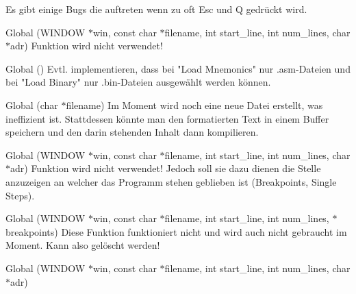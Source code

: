 \begin{DoxyRefList}
Es gibt einige Bugs die auftreten wenn zu oft \textquotesingle{}Esc\textquotesingle{} und \textquotesingle{}Q\textquotesingle{} gedrückt wird. 
\item[Global \doxylink{debugger_8c_a19b22144694590f898d23442237aecac}{del\+Marked\+Line} (WINDOW \texorpdfstring{$\ast$}{*}win, const char \texorpdfstring{$\ast$}{*}filename, int start\+\_\+line, int num\+\_\+lines, char \texorpdfstring{$\ast$}{*}adr)]\label{todo__todo000014}%
%
Funktion wird nicht verwendet! 
\item[Global \doxylink{filechooser_8c_a48924acb10cfd3bf3cb170d134f05f8f}{filechooser} ()]\label{todo__todo000018}%
%
Evtl. implementieren, dass bei "{}\+Load Mnemonics"{} nur .asm-\/\+Dateien und bei "{}\+Load Binary"{} nur .bin-\/\+Dateien ausgewählt werden können.  
\item[Global \doxylink{Compiler_8h_a374ccb28373614a55ce393e47b81acab}{format\+File} (char \texorpdfstring{$\ast$}{*}filename)]\label{todo__todo000004}%
%
Im Moment wird noch eine neue Datei erstellt, was ineffizient ist. Stattdessen könnte man den formatierten Text in einem Buffer speichern und den darin stehenden Inhalt dann kompilieren. 
\item[Global \doxylink{debugger_8c_aabd40a78225de224f26b54c84693903d}{highlight\+Line} (WINDOW \texorpdfstring{$\ast$}{*}win, const char \texorpdfstring{$\ast$}{*}filename, int start\+\_\+line, int num\+\_\+lines, char \texorpdfstring{$\ast$}{*}adr)]\label{todo__todo000015}%
%
Funktion wird nicht verwendet! Jedoch soll sie dazu dienen die Stelle anzuzeigen an welcher das Programm stehen geblieben ist (Breakpoints, Single Steps). 
\item[Global \doxylink{breakpointmanager_8c_a181c06c3f096d959fd2b3d2cf65e3b8f}{mark\+Breakpoints} (WINDOW \texorpdfstring{$\ast$}{*}win, const char \texorpdfstring{$\ast$}{*}filename, int start\+\_\+line, int num\+\_\+lines, \doxylink{structBreakpoint}{Breakpoint} \texorpdfstring{$\ast$}{*}breakpoints)]\label{todo__todo000007}%
%
Diese Funktion funktioniert nicht und wird auch nicht gebraucht im Moment. Kann also gelöscht werden!  
\item[Global \doxylink{debugger_8c_a50bb1defdd5cf04ac2ed5c55c2d5344f}{mark\+Line} (WINDOW \texorpdfstring{$\ast$}{*}win, const char \texorpdfstring{$\ast$}{*}filename, int start\+\_\+line, int num\+\_\+lines, char \texorpdfstring{$\ast$}{*}adr)]\label{todo__todo000013}%
%

\end{DoxyRefList}
